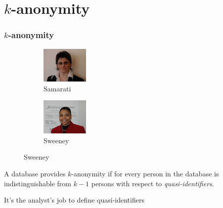 \section{$k$-anonymity}

\begin{frame}
  \frametitle{$k$-anonymity}
  \begin{figure}[H]
    \centering
    \begin{subfigure}{0.45\textwidth}
      \includegraphics[width=0.25\textwidth]{../figures/samarati}
      \caption{Samarati}
    \end{subfigure}
    \begin{subfigure}{0.45\textwidth}
      \includegraphics[width=0.25\textwidth]{../figures/sweeney}
      \caption{Sweeney}
    \end{subfigure}
  \end{figure}

  \begin{definition}[$k$-anonymity]
    A database provides $k$-anonymity if for every person in the database is indistinguishable from $k-1$ persons with respect to \emph{quasi-identifiers}.
  \end{definition}
  \alert{It's the analyst's job to define quasi-identifiers}
  
\end{frame}

